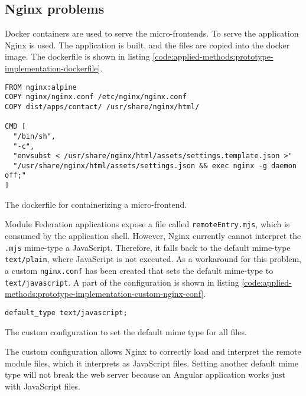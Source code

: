 \subsection{Nginx problems}

Docker containers are used to serve the micro-frontends. To serve the application Nginx is used. The application is built, and the files are copied into the docker image. The dockerfile is shown in listing \ref{code:applied-methods:prototype-implementation-dockerfile}.

\ifshowListings
  \begin{listing}[H]
  \begin{verbatim}
FROM nginx:alpine
COPY nginx/nginx.conf /etc/nginx/nginx.conf
COPY dist/apps/contact/ /usr/share/nginx/html/
    
CMD [
  "/bin/sh", 
  "-c", 
  "envsubst < /usr/share/nginx/html/assets/settings.template.json >" 
  "/usr/share/nginx/html/assets/settings.json && exec nginx -g daemon off;"
]
  \end{verbatim}
  \caption{The dockerfile for containerizing a micro-frontend.}\label{code:applied-methods:prototype-implementation-dockerfile}
  \end{listing}
\fi

\noindent Module Federation applications expose a file called \texttt{remoteEntry.mjs}, which is consumed by the application shell. However, Nginx currently cannot interpret the \texttt{\*.mjs} mime-type a JavaScript. Therefore, it falls back to the default mime-type \texttt{text/plain}, where JavaScript is not executed. As a workaround for this problem, a custom \texttt{nginx.conf} has been created that sets the default mime-type to \texttt{text/javascript}. A part of the configuration is shown in listing \ref{code:applied-methods:prototype-implementation-custom-nginx-conf}.

\ifshowListings
  \begin{listing}[H]
  \begin{verbatim}
default_type text/javascript;
  \end{verbatim}
  \caption{The custom configuration to set the default mime type for all files.}\label{code:applied-methods:prototype-implementation-custom-nginx-conf}
  \end{listing}
\fi

\noindent The custom configuration allows Nginx to correctly load and interpret the remote module files, which it interprets as JavaScript files. Setting another default mime type will not break the web server because an Angular application works just with JavaScript files.